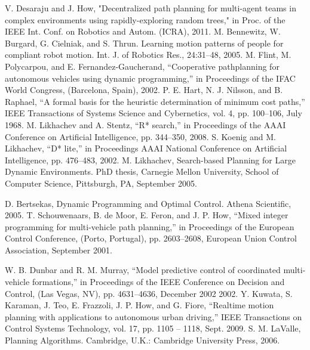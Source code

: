 \documentclass[a4paper]{article}
\begin{document}
\begin{thebibliography}{9}
 V. Desaraju and J. How, "Decentralized path planning for multi-agent teams in complex environments using rapidly-exploring random trees," in Proc. of the IEEE Int. Conf. on Robotics and Autom. (ICRA), 2011.
 M. Bennewitz, W. Burgard, G. Cielniak, and S. Thrun. Learning motion patterns of people for compliant robot motion. Int. J. of Robotics Res., 24:31–48, 2005.
 M. Flint, M. Polycarpou, and E. Fernandez-Gaucherand, “Cooperative pathplanning
for autonomous vehicles using dynamic programming,” in Proceedings of the IFAC World Congress, (Barcelona, Spain), 2002.
 P. E. Hart, N. J. Nilsson, and B. Raphael, “A formal basis for the heuristic determination of minimum cost paths,” IEEE Transactions of Systems Science and Cybernetics, vol. 4, pp. 100–106, July 1968.
 M. Likhachev and A. Stentz, “R* search,” in Proceedings of the AAAI Conference
on Artificial Intelligence, pp. 344–350, 2008.
 S. Koenig and M. Likhachev, “D* lite,” in Proceedings AAAI National Conference
on Artificial Intelligence, pp. 476–483, 2002.
 M. Likhachev, Search-based Planning for Large Dynamic Environments. PhD
thesis, Carnegie Mellon University, School of Computer Science, Pittsburgh, PA,
September 2005.

 D. Bertsekas, Dynamic Programming and Optimal Control. Athena Scientific, 2005.
 T. Schouwenaars, B. de Moor, E. Feron, and J. P. How, “Mixed integer programming
for multi-vehicle path planning,” in Proceedings of the European Control Conference, (Porto, Portugal), pp. 2603–2608, European Union Control Association, September 2001.

 W. B. Dunbar and R. M. Murray, “Model predictive control of coordinated multi-vehicle formations,” in Proceedings of the IEEE Conference on Decision and Control, (Las Vegas, NV), pp. 4631–4636, December 2002 2002.
 Y. Kuwata, S. Karaman, J. Teo, E. Frazzoli, J. P. How, and G. Fiore, “Realtime
motion planning with applications to autonomous urban driving,” IEEE Transactions on Control Systems Technology, vol. 17, pp. 1105 – 1118, Sept. 2009.
 S. M. LaValle, Planning Algorithms. Cambridge, U.K.: Cambridge University
Press, 2006.

\end{thebibliography}
\end{document}
